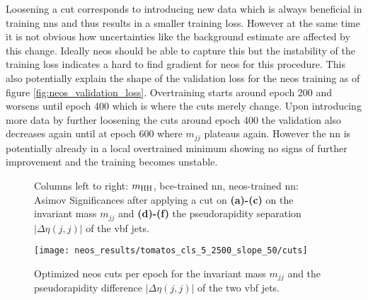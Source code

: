 Loosening a cut corresponds to introducing new data which is always beneficial in training \acp{nn} and thus results in a smaller training loss. However at the same time it is not obvious how uncertainties like the background estimate are affected by this change. Ideally \ac{neos} should be able to capture this but the instability of the training loss indicates a hard to find gradient for \ac{neos} for this procedure. This also potentially explain the shape of the validation loss for the \ac{neos} training as of figure \ref{fig:neos_validation_loss}. Overtraining starts around epoch 200 and worsens until epoch 400 which is where the cuts merely change. Upon introducing more data by further loosening the cuts around epoch 400 the validation also decreases again until at epoch 600 where $m_{jj}$ plateaus again. However the \ac{nn} is potentially already in a local overtrained minimum showing no signs of further improvement and the training becomes unstable. 


\begin{figure}
    \centering
    \caption[]{Columns left to right: $m_\text{HH}$, \ac{bce}-trained \ac{nn}, \ac{neos}-trained \ac{nn}: Asimov Significances after applying a cut on \textbf{(a)-(c)} on the invariant mass $m_{jj}$ and \textbf{(d)-(f)} the pseudorapidity separation $|\Delta\eta(j,j)|$ of the \ac{vbf} jets. }
    \label{fig:cut_scan}
\end{figure}

\begin{figure}
    \centering
    \texttt{[image: neos\_results/tomatos\_cls\_5\_2500\_slope\_50/cuts]}
    \caption[]{Optimized \ac{neos} cuts per epoch for the invariant mass $m_{jj}$ and the pseudorapidity difference $|\Delta\eta(j,j)|$ of the two \ac{vbf} jets.}
    \label{fig:neos_cuts}
\end{figure}

